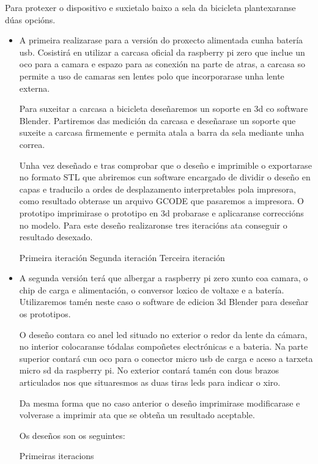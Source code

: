 Para protexer o dispositivo e suxietalo baixo a sela da bicicleta plantexaranse dúas opcións.
\begin{itemize}
    \item A primeira realizarase para a versión do proxecto alimentada cunha batería usb. Cosistirá en utilizar a carcasa oficial da raspberry pi zero que inclue un oco para a camara e espazo para as conexión na parte de atras, a carcasa so permite a uso de camaras sen lentes polo que incorporarase unha lente externa.

    Para suxeitar a carcasa a bicicleta deseñaremos un soporte en 3d co software Blender. Partiremos das medición da carcasa e deseñarase un soporte que suxeite a carcasa firmemente e permita atala a barra da sela mediante unha correa.

    Unha vez deseñado e tras comprobar que o deseño e imprimible o exportarase no formato STL que abriremos cun software encargado de dividir o deseño en capas e traducilo a ordes de desplazamento interpretables pola impresora, como resultado obterase un arquivo GCODE que pasaremos a impresora. O prototipo imprimirase o prototipo en 3d probarase e aplicaranse correccións no modelo. Para este deseño realizaronse tres iteracións ata conseguir o resultado desexado.

    Primeira iteración
    Segunda iteración
    Terceira iteración

    \item A segunda versión terá que albergar a raspberry pi zero xunto coa camara, o chip de carga e alimentación, o conversor loxico de voltaxe e a batería. Utilizaremos tamén neste caso o software de edicion 3d Blender para deseñar os prototipos.

    O deseño contara co anel led situado no exterior o redor da lente da cámara, no interior colocaranse tódalas compoñetes electrónicas e a bateria. Na parte superior contará cun oco para o conector micro usb de carga e aceso a tarxeta micro sd da raspberry pi. No exterior contará tamén con dous brazos articulados nos que situaresmos as duas tiras leds para indicar o xiro.

    Da mesma forma que no caso anterior o deseño imprimirase modificarase e volverase a imprimir ata que se obteña un resultado aceptable.

    Os deseños son os seguintes:

    Primeiras iteracions


\end{itemize}

